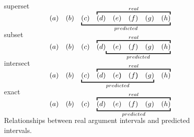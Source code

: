 \begin{figure}[!htbp]
\centering

superset
\vspace{0.2em}
{\large
\[
\begin{array}{*8{c}}
(a)&(b)&\underscope{predicted}{(c)&\overscope{real}{(d)&(e)&(f)&(g)&(h)}}
\end{array}
\]
}
\vspace{0.5em}

subset
\vspace{0.2em}
{\large
\[
\begin{array}{*8{c}}
(a)&(b)&(c)&\overscope{real}{(d)\underscope{predicted}{&(e)&(f)&(g)&(h)}}
\end{array}
\]
}
\vspace{0.5em}

intersect
\vspace{0.2em}
{\large
\[\def\arraystretch{0.0}
\begin{array}{*8{c}}
(a)&(b)&(c)&\overscope{real}{(d)&(e)&(f)&(g)&(h)}\\[-1em]
\hphantom{(a)}&\hphantom{(b)}&\underscope{predicted}
{\hphantom{(c)}&\hphantom{(d)}&\hphantom{(e})&\hphantom{(f})&
\hphantom{(g)}}&\hphantom{(h)}
\end{array}
\]
}
\vspace{0.5em}

exact
\vspace{0.2em}
{\large
\[
\begin{array}{*8{c}}
(a)&(b)&(c)&\underscope{predicted}{\overscope{real}{(d)&(e)&(f)&(g)&(h)}}
\end{array}
\]
}
\vspace{0.5em}

\caption{\label{i:args-relationship} Relationships between real argument intervals
and predicted intervals. }

\end{figure}
